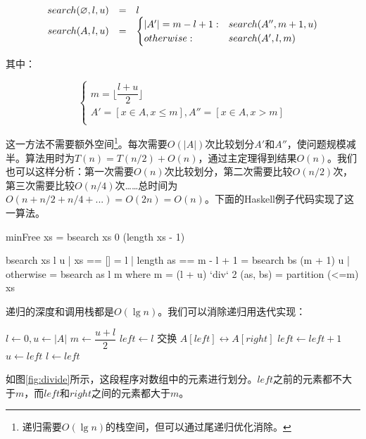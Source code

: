 \documentclass[b5paper]{ctexart}
\begin{document}
\[
\begin{array}{rcl}
search(\varnothing, l, u) & = & l \\
search(A, l, u) & = & \begin{cases}
       |A'| = m - l + 1 : & search(A'', m+1, u) \\
       otherwise : & search(A',  l, m) \\
\end{cases}
\end{array}
\]

其中：

\[
\begin{cases}
m = \lfloor \dfrac{l + u}{2} \rfloor \\
A' = [x \in A, x \leq m ], A'' = [x \in A, x > m ] \\
\end{cases}
\]

这一方法不需要额外空间\footnote{递归需要$O(\lg n)$的栈空间，但可以通过尾递归优化消除。}。每次需要$O(|A|)$次比较划分$A'$和$A''$，使问题规模减半。算法用时为$T(n) = T(n/2) + O(n)$，通过主定理得到结果$O(n)$。我们也可以这样分析：第一次需要$O(n)$次比较划分，第二次需要比较$O(n/2)$次，第三次需要比较$O(n/4)$次……总时间为$O(n + n/2 + n/4 + ...) = O(2n) = O(n)$。下面的Haskell例子代码实现了这一算法。

\lstset{frame = single}
\begin{Haskell}
minFree xs = bsearch xs 0 (length xs - 1)

bsearch xs l u | xs == [] = l
               | length as == m - l + 1 = bsearch bs (m + 1) u
               | otherwise = bsearch as l m
    where
      m = (l + u) `div` 2
      (as, bs) = partition (<=m) xs
\end{Haskell}

递归的深度和调用栈都是$O(\lg n)$。我们可以消除递归用迭代实现：

\begin{algorithmic}[1]
  \State $l \gets 0, u \gets |A|$
    \State $m \gets \dfrac{u + l}{2}$
    \State $left \gets l$
        \State 交换 $A[left] \leftrightarrow A[right]$
        \State $left \gets left + 1$
      \EndIf
    \EndFor
      \State $u \gets left$
    \Else
      \State $l \gets left$
    \EndIf
  \EndWhile
\EndFunction
\end{algorithmic}

如图\ref{fig:divide}所示，这段程序对数组中的元素进行划分。$left$之前的元素都不大于$m$，而$left$和$right$之间的元素都大于$m$。
\end{document}

